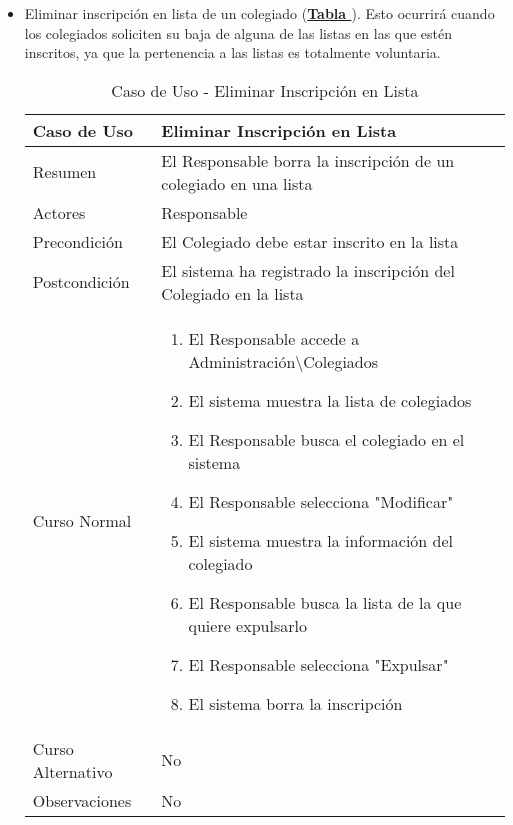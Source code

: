 \begin{itemize}
		\item \addtocounter{tabla}{1} Eliminar inscripción en lista de un colegiado (\textbf{\hyperref[tab:curEliminarInscrLst]{Tabla }}). Esto ocurrirá cuando los colegiados soliciten su baja de alguna de las listas en las que estén inscritos, ya que la pertenencia a las listas es totalmente voluntaria.
		\begin{table}[!htbp]
		  \centering  \addtocounter{casouso}{1}
		  \begin{tabular}{|l | p{100mm}|}
		    \textbf{Caso de Uso}  & \textbf{Eliminar Inscripción en Lista} \\ \hline
		    Resumen 		 & El Responsable borra la inscripción de un colegiado en una lista \\ \hline
		    Actores  		 & Responsable \\ \hline
		    Precondición  	 & El Colegiado debe estar inscrito en la lista  \\ \hline
		    Postcondición  	 & El sistema ha registrado la inscripción del Colegiado en la lista \\ \hline
		    Curso Normal   	 & \begin{enumerate}
			  \item El Responsable accede a Administración\textbackslash Colegiados
			  \item El sistema muestra la lista de colegiados
			  \item El Responsable busca el colegiado en el sistema
			  \item El Responsable selecciona "Modificar"
			  \item El sistema muestra la información del colegiado
			  \item El Responsable busca la lista de la que quiere expulsarlo
			  \item El Responsable selecciona "Expulsar"
			  \item El sistema borra la inscripción
		    \end{enumerate}  \\ \hline
		    Curso Alternativo  & No  \\ \hline
		    Observaciones 	 & No \\ \hline
		  \end{tabular}
		  \caption{Caso de Uso  - Eliminar Inscripción en Lista}
		  \label{tab:curEliminarInscrLst}
		\end{table}
		\FloatBarrier
\end{itemize}

